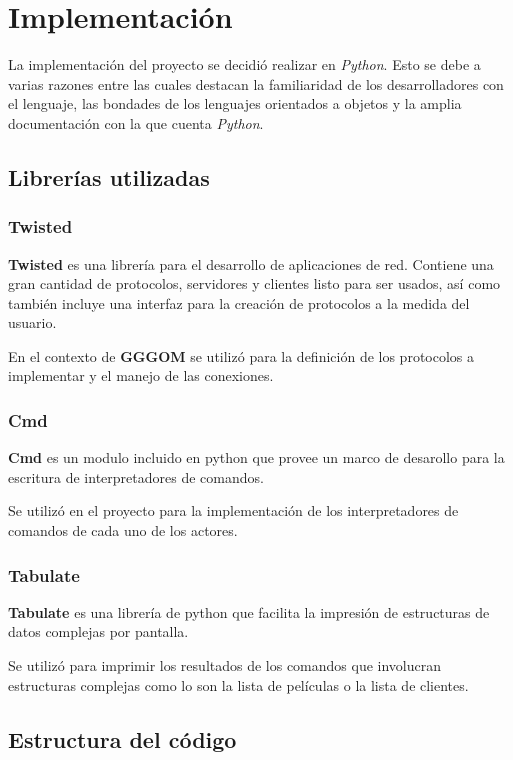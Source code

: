 \documentclass{article}
\begin{document}
\clearpage
\section*{Implementación}
La implementación del proyecto se decidió realizar en \emph{Python}. Esto se debe a varias razones entre las cuales 
destacan la familiaridad de los desarrolladores con el lenguaje, las bondades de los lenguajes orientados a objetos
y la amplia documentación con la que cuenta \emph{Python}.

\subsection*{Librerías utilizadas}

\subsubsection*{Twisted}
\textbf{Twisted} es una librería para el desarrollo de aplicaciones de red. Contiene una gran cantidad de protocolos, servidores y clientes 
listo para ser usados, así como también incluye una interfaz para la creación de protocolos a la medida del usuario. 

En el contexto de \textbf{GGGOM} se utilizó para la definición de los protocolos a implementar y el manejo de las conexiones.

\subsubsection*{Cmd}
\textbf{Cmd} es un modulo incluido en python que provee un marco de desarollo para la escritura de interpretadores de comandos.

Se utilizó en el proyecto para la implementación de los interpretadores de comandos de cada uno de los actores.

\subsubsection*{Tabulate}
\textbf{Tabulate} es una librería de python que facilita la impresión de estructuras de datos complejas por pantalla. 

Se utilizó para imprimir los resultados de los comandos que involucran estructuras complejas como lo son la lista de películas o la lista de clientes.

\subsection*{Estructura del código}
\end{document}
